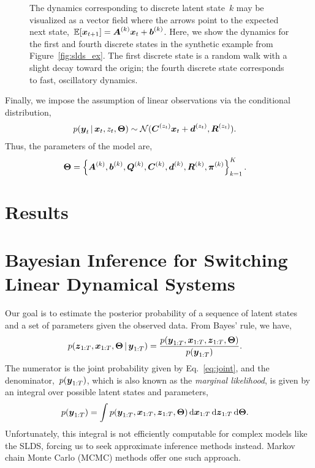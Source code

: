 \documentclass{article}
\begin{document}
\begin{figure}[t]
\begin{subfigure}{.49\textwidth}
\end{subfigure} 
\caption{The dynamics corresponding to discrete latent state~$k$ may
  be visualized as a vector field where the arrows point to the
  expected next state,~$\mathbb{E}[\boldsymbol{x}_{t+1}]=\boldsymbol{A}^{(k)}\boldsymbol{x}_t + \boldsymbol{b}^{(k)}$.
Here, we show the dynamics for the first and fourth discrete states 
in the synthetic example from Figure~\ref{fig:slds_ex}. The first 
discrete state is a random walk with a slight decay toward the origin;
the fourth discrete state corresponds to fast, oscillatory dynamics.}
\label{fig:slds_dynamics_ex}
\vspace{-0.5cm}
\end{figure}



Finally, we impose the assumption of linear observations via the conditional
distribution,
\begin{align}
  p(\boldsymbol{y}_t \,|\, \boldsymbol{x}_{t}, z_{t}, \boldsymbol{\Theta}) 
  &\sim \mathcal{N}(\boldsymbol{C}^{(z_{t})} \boldsymbol{x}_{t} + \boldsymbol{d}^{(z_{t})}, \boldsymbol{R}^{(z_t)}).
\end{align}
Thus, the parameters of the model are,
\begin{align}
  \boldsymbol{\Theta} &= \left\{ \boldsymbol{A}^{(k)}, \boldsymbol{b}^{(k)}, \boldsymbol{Q}^{(k)}, \boldsymbol{C}^{(k)}, \boldsymbol{d}^{(k)}, \boldsymbol{R}^{(k)}, \boldsymbol{\pi}^{(k)} \right\}_{k=1}^K .
\end{align}



\section{Results}




\appendix

\section{Bayesian Inference for Switching Linear Dynamical Systems}
Our goal is to estimate the posterior probability of a sequence 
of latent states and a set of parameters given the observed data.
From Bayes' rule, we have,
\begin{align}
  p(\boldsymbol{z}_{1:T}, \boldsymbol{x}_{1:T}, \boldsymbol{\Theta} \,|\, \boldsymbol{y}_{1:T}) 
  &= 
  \frac{p(\boldsymbol{y}_{1:T}, \boldsymbol{x}_{1:T}, \boldsymbol{z}_{1:T}, \boldsymbol{\Theta})}{p(\boldsymbol{y}_{1:T})}.
\end{align}
The numerator is the joint probability given by Eq.~\eqref{eq:joint}, and
the denominator,~$p(\boldsymbol{y}_{1:T})$, which is also known as the
\emph{marginal likelihood}, is given by an integral over possible
latent states and parameters,
\begin{align}
  p(\boldsymbol{y}_{1:T}) &= \int p(\boldsymbol{y}_{1:T}, \boldsymbol{x}_{1:T}, \boldsymbol{z}_{1:T}, \boldsymbol{\Theta}) 
  \, \mathrm{d}\boldsymbol{x}_{1:T} \, \mathrm{d}\boldsymbol{z}_{1:T} \, \mathrm{d}\boldsymbol{\Theta}.
\end{align}
Unfortunately, this integral is not efficiently computable for complex
models like the SLDS, forcing us to seek approximate inference methods
instead. Markov chain Monte Carlo (MCMC) methods  offer one
such approach. 
\end{document}
